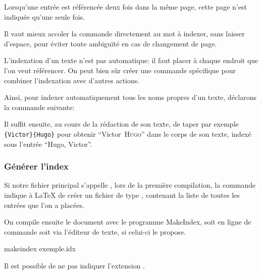  Lorsqu'une entrée est référencée deux fois dans la même page, cette page n'est indiquée qu'une seule fois. 

\begin{attention}
Il vaut mieux accoler la commande  directement au  mot à indexer, sans laisser d'espace, pour éviter toute ambiguïté en cas de changement de page.

\end{attention}


L'indexation d'un texte n'est pas automatique: il faut placer  à chaque endroit  que l'on veut référencer. On  peut bien sûr créer une commande  spécifique pour combiner l'indexation avec d'autres actions.

Ainsi, pour indexer automatiquement tous les noms propres d'un texte, déclarons la commande suivante:\label{indexauteur}

\begin{latexcode}
\newcommand\auteur[2]{#1~\textsc{#2}\index{#2, #1}\xspace}
\end{latexcode}

\renewcommand\auteur[2]{#1~\textsc{#2}\xspace}

Il suffit ensuite, au cours de la rédaction de son texte, de taper par exemple \verb|{Victor}{Hugo}| pour obtenir \enquote{\auteur{Victor}{Hugo}} dans le corps de son texte, indexé sous l'entrée \enquote{Hugo, Victor}.


\subsubsection{Générer l'index}

Si notre fichier principal s'appelle , lors de la première compilation, la commande  indique à \LaTeX{} de créer un fichier de type , contenant la liste de toutes les entrées que l'on a placées. 
 




On compile ensuite le document avec le programme MakeIndex, soit  en ligne de commande  soit via l'éditeur de texte, si celui-ci le propose.

\begin{bashcode}
makeindex exemple.idx
\end{bashcode}

Il est possible de ne pas indiquer l'extension .

